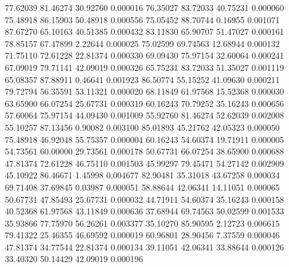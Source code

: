        77.62039       81.46274       30.92760       0.000016
       76.35027       83.72033       40.75231       0.000060
       75.48918       86.15903       50.48918       0.000556
       75.05452       88.70744        0.16955       0.001071
       87.67270       65.10163       40.51385       0.000432
       83.11830       65.90707       51.47027       0.000161
       78.85157       67.47899        2.22644       0.000025
       75.02599       69.74563       12.68944       0.000132
       71.75110       72.61228       22.81374       0.000330
       69.09430       75.97154       32.60064       0.000241
       67.09019       79.71141       42.09019       0.000326
       65.75231       83.72033       51.35027       0.001119
       65.08357       87.88911        0.46641       0.001923
       86.50774       55.15252       41.09630       0.000211
       79.72794       56.35591       53.11321       0.000020
       68.11849       61.97568       15.52368       0.000030
       63.65900       66.07254       25.67731       0.000319
       60.16243       70.79252       35.16243       0.000656
       57.60064       75.97154       44.09430       0.001009
       55.92760       81.46274       52.62039       0.002008
       55.10257       87.13456        0.90082       0.003100
       85.01893       45.21762       42.05323       0.000050
       75.48918       46.92048       55.75357       0.000004
       60.16243       54.60374       19.71911       0.000005
       54.73561       60.00000       29.73561       0.000178
       50.67731       66.07254       38.65900       0.000688
       47.81374       72.61228       46.75110       0.001503
       45.99297       79.45471       54.27142       0.002909
       45.10922       86.46671        1.45998       0.004677
       82.90481       35.31018       43.67258       0.000034
       69.71408       37.69845        0.03987       0.000051
       58.88644       42.06341       14.11051       0.000065
       50.67731       47.85493       25.67731       0.000032
       44.71911       54.60374       35.16243       0.000158
       40.52368       61.97568       43.11849       0.000636
       37.68944       69.74563       50.02599       0.001533
       35.93866       77.75970       56.26261       0.003377
       35.10270       85.90595        2.12723       0.006615
       79.41322       25.46355       46.69592       0.000019
       60.96801       28.90456        7.37559       0.000046
       47.81374       34.77544       22.81374       0.000134
       39.11051       42.06341       33.88644       0.000126
       33.40320       50.14429       42.09019       0.000196
